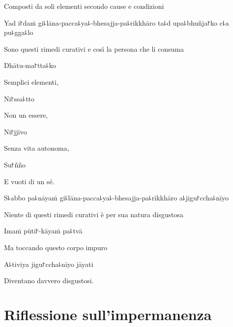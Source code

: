 \begin{english}
Composti da soli elementi secondo cause e condizioni
\end{english}

Yad i꜓daṁ gi꜕lāna-pacca꜕ya꜕-bhesajja-pa꜕rikkhāro ta꜕d upa꜕bhuñja꜓ko c꜕a pu꜕gga꜕lo

\begin{english}
Sono questi rimedi curativi e così la persona che li consuma
\end{english}

Dhātu-ma꜓tta꜕ko

\begin{english}
Semplici elementi,
\end{english}

Ni꜓ssa꜕tto

\begin{english}
Non un essere,
\end{english}

Ni꜓jjīvo

\begin{english}
Senza vita autonoma,
\end{english}

Su꜓ñño

\begin{english}
E vuoti di un sé.
\end{english}

S꜕abbo pa꜕nāyaṁ gi꜕lāna-pacca꜕ya꜕-bhesajja-pa꜕rikkhāro a꜕jigu꜓ccha꜕nīyo

\begin{english}
Niente di questi rimedi curativi è per sua natura disgustosa
\end{english}

Imaṁ pūti꜓-kāyaṁ pa꜕tvā

\begin{english}
Ma toccando questo corpo impuro
\end{english}

A꜕tiviya jigu꜓ccha꜕nīyo jāyati

\begin{english}
Diventano davvero disgustosi.
\end{english}

\chapter{Riflessione sull'impermanenza}


\begin{leader}
\end{leader}

